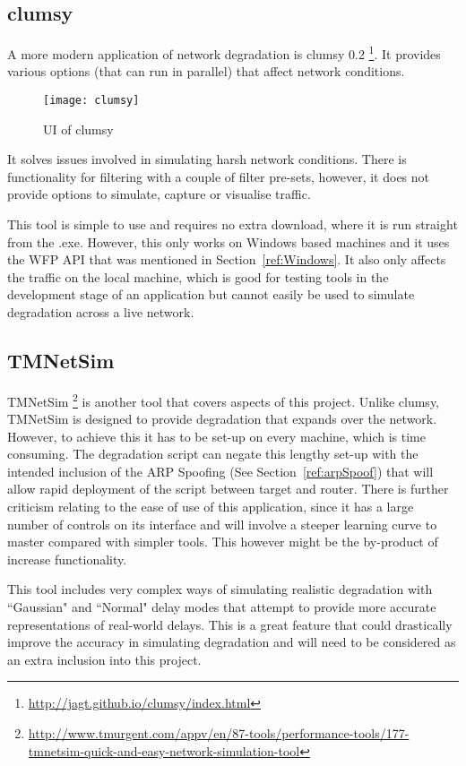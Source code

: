 \subsection{clumsy}
A more modern application of network degradation is clumsy 0.2 \footnote{\url{http://jagt.github.io/clumsy/index.html}}. It provides various options (that can run in parallel) that affect network conditions. 

\begin{wrapfigure}{r}{5cm}
\begin{center}
	\texttt{[image: clumsy]}
	\caption{UI of clumsy}
\end{center}
\end{wrapfigure}

It solves issues involved in simulating harsh network conditions. There is functionality for filtering with a couple of filter pre-sets, however, it does not provide options to simulate, capture or visualise traffic.

This tool is simple to use and requires no extra download, where it is run straight from the .exe. However, this only works on Windows based machines and it uses the WFP API that was mentioned in Section~\ref{ref:Windows}. It also only affects the traffic on the local machine, which is good for testing tools in the development stage of an application but cannot easily be used to simulate degradation across a live network.

\subsection{TMNetSim}
TMNetSim \footnote{\url{http://www.tmurgent.com/appv/en/87-tools/performance-tools/177-tmnetsim-quick-and-easy-network-simulation-tool}} is another tool that covers aspects of this project. Unlike clumsy, TMNetSim is designed to provide degradation that expands over the network. However, to achieve this it has to be set-up on every machine, which is time consuming. The degradation script can negate this lengthy set-up with the intended inclusion of the ARP Spoofing (See Section~\ref{ref:arpSpoof}) that will allow rapid deployment of the script between target and router. There is further criticism relating to the ease of use of this application, since it has a large number of controls on its interface and will involve a steeper learning curve to master compared with simpler tools. This however might be the by-product of increase functionality.

This tool includes very complex ways of simulating realistic degradation with ``Gaussian" and ``Normal" delay modes that attempt to provide more accurate representations of real-world delays. This is a great feature that could drastically improve the accuracy in simulating degradation and will need to be considered as an extra inclusion into this project.

